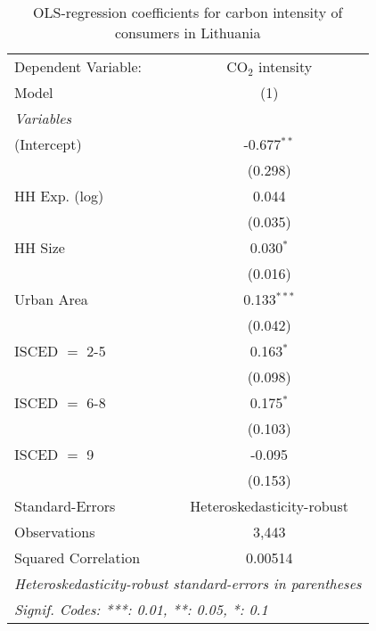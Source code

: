 
\begin{table}[htbp!]
   \centering
   \small
   \begin{adjustbox}{width = 1\textwidth, max height = 0.95\textheight, center}
      \begin{threeparttable}[b]
         \caption{\label{tab:OLS_1_LTU} OLS-regression coefficients for carbon intensity of consumers in Lithuania}
         \begin{tabular}{lc}
            \tabularnewline \midrule \midrule
            Dependent Variable: & CO$_{2}$ intensity\\  
            Model               & (1)\\  
            \midrule
            \emph{Variables}\\
            (Intercept)         & -0.677$^{**}$\\   
                                & (0.298)\\   
            HH Exp. (log)       & 0.044\\   
                                & (0.035)\\   
            HH Size             & 0.030$^{*}$\\   
                                & (0.016)\\   
            Urban Area          & 0.133$^{***}$\\   
                                & (0.042)\\   
            ISCED $=$ 2-5       & 0.163$^{*}$\\   
                                & (0.098)\\   
            ISCED $=$ 6-8       & 0.175$^{*}$\\   
                                & (0.103)\\   
            ISCED $=$ 9         & -0.095\\   
                                & (0.153)\\   
            \midrule 
            Standard-Errors     & Heteroskedasticity-robust \\   
            Observations        & 3,443\\  
            Squared Correlation & 0.00514\\  
            \midrule \midrule
            \multicolumn{2}{l}{\emph{Heteroskedasticity-robust standard-errors in parentheses}}\\
            \multicolumn{2}{l}{\emph{Signif. Codes: ***: 0.01, **: 0.05, *: 0.1}}\\
         \end{tabular}
         

\end{threeparttable}
\end{adjustbox}
\end{table}
